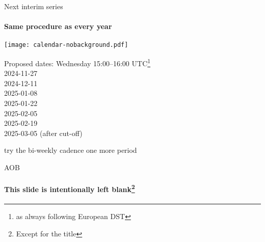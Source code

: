 \documentclass[aspectratio=169]{beamer}
\begin{document}
\begin{frame}{Next interim series}\large
    \framesubtitle{Same procedure as every year}
    \begin{block}{\texttt{[image: calendar-nobackground.pdf]}\mbox{\quad}}
    \end{block}
    \vspace{-2cm}

    Proposed dates: Wednesday 15:00--16:00 UTC\footnote{as always following European DST}\\
    2024-11-27\\
    2024-12-11\\
    2025-01-08\\
    2025-01-22\\
    2025-02-05\\
    2025-02-19\\
    2025-03-05 (after cut-off)

    \bigskip

    try the bi-weekly cadence one more period
\end{frame}

\begin{frame}{AOB}\large
    \framesubtitle{This slide is intentionally left blank\footnote{Except for the title}}
\end{frame}
\end{document}
